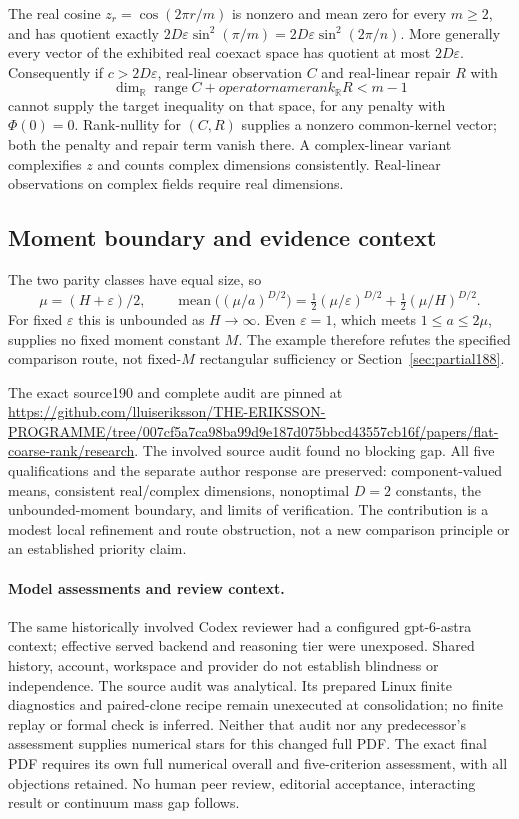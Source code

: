 The real cosine $z_r=\cos(2\pi r/m)$ is nonzero and mean zero for every
$m\ge2$, and has quotient exactly
$2D\varepsilon\sin^2(\pi/m)=2D\varepsilon\sin^2(2\pi/n)$.
More generally every vector of the exhibited real coexact space has
quotient at most $2D\varepsilon$. Consequently if $c>2D\varepsilon$,
real-linear observation $C$ and real-linear repair $R$ with
\[
 \dim_{\mathbb R}\operatorname{range}C+operatorname{rank}_{\mathbb R}R<m-1
\]
cannot supply the target inequality on that space, for any penalty with
$\Phi(0)=0$. Rank-nullity for $(C,R)$ supplies a nonzero common-kernel
vector; both the penalty and repair term vanish there. A complex-linear
variant complexifies $z$ and counts complex dimensions consistently.
Real-linear observations on complex fields require real dimensions.

\subsection{Moment boundary and evidence context}
The two parity classes have equal size, so
\[
 \mu=(H+\varepsilon)/2,\qquad
 \operatorname{mean}\bigl((\mu/a)^{D/2}\bigr)
 =\tfrac12(\mu/\varepsilon)^{D/2}+\tfrac12(\mu/H)^{D/2}.
\]
For fixed $\varepsilon$ this is unbounded as $H\to\infty$. Even
$\varepsilon=1$, which meets $1\le a\le2\mu$, supplies no fixed moment
constant $M$. The example therefore refutes the specified comparison
route, not fixed-$M$ rectangular sufficiency or Section~\ref{sec:partial188}.

The exact source190 and complete audit are pinned at
\url{https://github.com/lluiseriksson/THE-ERIKSSON-PROGRAMME/tree/007cf5a7ca98ba99d9e187d075bbcd43557cb16f/papers/flat-coarse-rank/research}.
The involved source audit found no blocking gap. All five qualifications
and the separate author response are preserved: component-valued means,
consistent real/complex dimensions, nonoptimal $D=2$ constants, the
unbounded-moment boundary, and limits of verification. The contribution
is a modest local refinement and route obstruction, not a new comparison
principle or an established priority claim.

\paragraph{Model assessments and review context.}
The same historically involved Codex reviewer had a configured
gpt-6-astra context; effective served backend and reasoning tier were
unexposed. Shared history, account, workspace and provider do not establish
blindness or independence. The source audit was analytical. Its prepared
Linux finite diagnostics and paired-clone recipe remain unexecuted at
consolidation; no finite replay or formal check is inferred. Neither
that audit nor any predecessor's assessment supplies numerical stars for
this changed full PDF. The exact final PDF requires its own full
numerical overall and five-criterion assessment, with all objections
retained. No human peer review, editorial acceptance, interacting result
or continuum mass gap follows.
